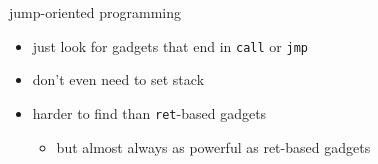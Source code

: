 
\begin{frame}{jump-oriented programming}
    \begin{itemize}
        \item just look for gadgets that end in \texttt{call} or \texttt{jmp}
        \item don't even need to set stack
        \item harder to find than \texttt{ret}-based gadgets
            \begin{itemize}
            \item but almost always as powerful as ret-based gadgets
            \end{itemize}
    \end{itemize}
\end{frame}

